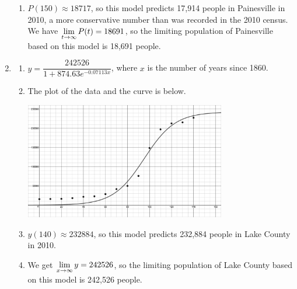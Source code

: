 \documentclass{ximera}
\begin{document}
\begin{enumerate}
\begin{enumerate}
\item $P(150) \approx 18717$, so this model predicts 17,914 people in Painesville in 2010, a more conservative number than was recorded in the 2010 census.  We have $\ds{\lim_{t \rightarrow \infty} P(t) =  18691}$,  so the limiting population of Painesville based on this model is 18,691 people.

\enlargethispage{\baselineskip}

\end{enumerate}

\item \begin{enumerate}  \item  $y = \dfrac{242526}{1+874.63e^{-0.07113x}}$, where $x$ is the number of years since 1860.

\item  The plot of the data and the curve is below.

\centerline{\includegraphics[height=2in]{./ApplicationsofExponentialandLogarithmicFunctionsGraphics/LAKECOUNTYLOGISTIC.jpg}} 

\item  $y(140) \approx 232884$, so this model predicts 232,884 people in Lake County in 2010.

\item  We get $\ds{\lim_{x \rightarrow \infty} y = 242526}$, so the limiting population of Lake County based on this model is 242,526 people.

\end{enumerate}

\end{enumerate}
\end{document}
